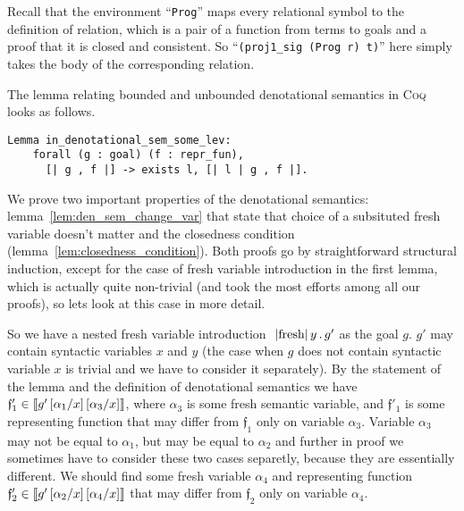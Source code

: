 Recall that the environment ``\lstinline[language=Coq]|Prog|'' maps every relational symbol to the definition of relation,
which is a pair of a function from terms to goals and a proof that it is closed and consistent.
So ``\lstinline[language=Coq]|(proj1_sig (Prog r) t)|'' here simply takes the body of the corresponding relation.

The lemma relating bounded and unbounded denotational semantics in \textsc{Coq} looks as follows.

\begin{lstlisting}[language=Coq] 
  Lemma in_denotational_sem_some_lev:
    forall (g : goal) (f : repr_fun),
      [| g , f |] -> exists l, [| l | g , f |].
\end{lstlisting}

We prove two important properties of the denotational semantics: lemma~\ref{lem:den_sem_change_var} that state that choice of a subsituted fresh variable doesn't matter and the closedness condition (lemma~\ref{lem:closedness_condition}). Both proofs go by straightforward structural induction, except for the case of fresh variable introduction in the first lemma, which is actually quite non-trivial (and took the most efforts among all our proofs), so lets look at this case in more detail.

So we have a nested fresh variable introduction $\mbox{\lstinline|fresh|}\,y\,.\,g'$ as the goal $g$. $g'$ may contain syntactic variables $x$ and $y$ (the case when $g$ does not contain syntactic variable $x$ is trivial and we have to consider it separately). By the statement of the lemma and the definition of denotational semantics we have ${\mathfrak f'_1} \in \llbracket{g'\,[\alpha_1/x]\,[\alpha_3/x]}\rrbracket$, where $\alpha_3$ is some fresh semantic variable, and ${\mathfrak f'_1}$ is some representing function that may differ from ${\mathfrak f_1}$ only on variable $\alpha_3$. Variable $\alpha_3$ may not be equal to $\alpha_1$, but may be equal to $\alpha_2$ and further in proof we sometimes have to consider these two cases separetly, because they are essentially different. We should find some fresh variable $\alpha_4$ and representing function ${\mathfrak f'_2} \in \llbracket{g'\,[\alpha_2/x]\,[\alpha_4/x]}\rrbracket$ that may differ from ${\mathfrak f_2}$ only on variable $\alpha_4$.

